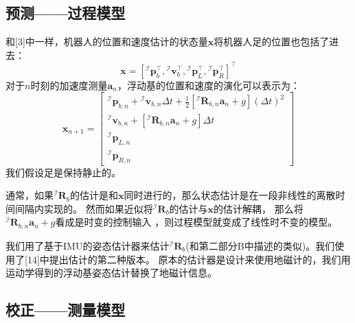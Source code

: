 \subsection{预测——过程模型}

和[3]中一样，机器人的位置和速度估计的状态量$\boldsymbol{x}$将机器人足的位置也包括了进去：
\begin{equation}
    \label{equ:est_posvel}
    \boldsymbol{x}=\left[{ }^\mathcal{I} \boldsymbol{p}_b^{\top},{ }^\mathcal{I} \boldsymbol{v}_b^{\top},{ }^\mathcal{I} \boldsymbol{p}_L^{\top},{ }^\mathcal{I} \boldsymbol{p}_R^{\top}\right]^{\top}
\end{equation}
对于$n$时刻的加速度测量$\boldsymbol{a}_n$，浮动基的位置和速度的演化可以表示为：
\begin{equation}
    \label{equ:est_posvel}
    \boldsymbol{x}_{n+1}=\left[\begin{array}{c}
        { }^{\mathcal{I}} \boldsymbol{p}_{b, n}+{ }^{\mathcal{I}} \boldsymbol{v}_{b, n} \Delta t+\frac{1}{2}\left[{ }^{\mathcal{I}} \boldsymbol{R}_{b, n} \boldsymbol{a}_n+g\right](\Delta t)^2 \\
        { }^{\mathcal{I}} \boldsymbol{v}_{b, n}+\left[{ }^{\mathcal{I}} \boldsymbol{R}_{b, n} \boldsymbol{a}_n+g\right] \Delta t \\
        { }^{\mathcal{I}} \boldsymbol{p}_{L, n} \\
        { }^{\mathcal{I}} \boldsymbol{p}_{R, n}
        \end{array}\right]
\end{equation}
我们假设足是保持静止的。

通常，如果${ }^{\mathcal{I}} \boldsymbol{R}_{b}$的估计是和$\boldsymbol{x}$同时进行的，那么状态估计是在一段非线性的离散时间间隔内实现的。
然而如果近似将${ }^{\mathcal{I}} \boldsymbol{R}_{b}$的估计与$\boldsymbol{x}$的估计解耦，
那么将${ }^{\mathcal{I}} \boldsymbol{R}_{b, n} \boldsymbol{a}_n+g$看成是时变的控制输入 ，则过程模型就变成了线性时不变的模型。

我们用了基于IMU的姿态估计器来估计${ }^{\mathcal{I}} \boldsymbol{R}_{b}$(和第二部分B中描述的类似)。我们使用了[14]中提出估计的第二种版本。
原本的估计器是设计来使用地磁计的，我们用运动学得到的浮动基姿态估计替换了地磁计信息。

\subsection{校正——测量模型}

